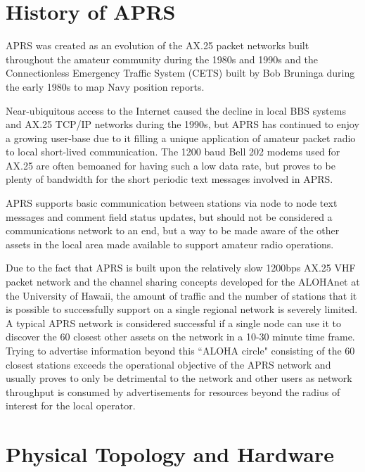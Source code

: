 \section{History of APRS}

APRS was created as an evolution of the AX.25 packet networks
built throughout the amateur community during the 1980s and 1990s and 
the Connectionless Emergency Traffic System (CETS) built by 
Bob Bruninga during the early 1980s to map Navy position reports.

Near-ubiquitous access to the Internet caused the decline in local BBS 
systems and AX.25 TCP/IP networks during the 1990s, but APRS has 
continued to enjoy a growing user-base due to it filling a unique 
application of amateur packet radio to local short-lived communication.
The 1200 baud Bell 202 modems used for AX.25 are often bemoaned for having
such a low data rate, but proves to be plenty of bandwidth for the short periodic
text messages involved in APRS.

APRS supports basic communication between stations via node to node 
text messages and comment field status updates, but should not be 
considered a communications network to an end, but a way to be made aware
of the other assets in the local area made available to support amateur 
radio operations.

Due to the fact that APRS is built upon the relatively slow 
1200bps AX.25 VHF packet
network and the channel sharing concepts developed for the ALOHAnet at
the University of Hawaii, the amount of 
traffic and the number of stations that it is possible to successfully 
support on a single regional network is severely limited. 
A typical APRS network is considered successful if a single node
can use it to discover the 60 closest other assets on the network in a
10-30 minute time frame. Trying to advertise information beyond this
``ALOHA circle" consisting of the 60 closest stations exceeds the 
operational objective of the APRS network and usually proves to only be 
detrimental to the network and other users as network throughput is 
consumed by advertisements for 
resources beyond the radius of interest for the local operator.

\section{Physical Topology and Hardware}

